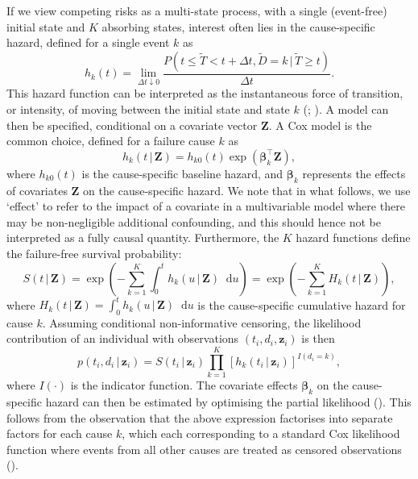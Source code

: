 \documentclass[
  letterpaper,
  paper=240mm:170mm,
  twoside=true,
  open=right,
  fontsize=10pt,
  pagesize=false,
  BCOR=15mm,
  DIV=14,
  headinclude=true,
  footinclude=false,
  headsepline=on]{scrbook}
\newcommand{\given}{\,|\,}
\newcommand\diff{\mathop{}\!\mathrm{d}}
\begin{document}
If we view competing risks as a multi-state process, with a single
(event-free) initial state and \(K\) absorbing states, interest often
lies in the cause-specific hazard, defined for a single event \(k\) as
\begin{equation*}
    h_k(t) = \lim_{\Delta t \downarrow 0} \frac{P(t \leq \tilde{T} < t + \Delta t, \tilde{D} = k \given \tilde{T} \geq t)}{\Delta t}.
\end{equation*} This hazard function can be interpreted as the
instantaneous force of transition, or intensity, of moving between the
initial state and state \(k\)
(;
). A model can then be specified, conditional on a covariate
vector \(\mathbf{Z}\). A Cox model is the common choice, defined for a
failure cause \(k\) as \begin{equation*}
    h_k(t \given \mathbf{Z}) = h_{k0}(t)\exp(\boldsymbol{\beta}_k^\top \mathbf{Z}),
\end{equation*} where \(h_{k0}(t)\) is the cause-specific baseline
hazard, and \(\boldsymbol{\beta}_k\) represents the effects of
covariates \(\mathbf{Z}\) on the cause-specific hazard. We note that in
what follows, we use `effect' to refer to the impact of a covariate in a
multivariable model where there may be non-negligible additional
confounding, and this should hence not be interpreted as a fully causal
quantity. Furthermore, the \(K\) hazard functions define the
failure-free survival probability: \begin{equation*}
    S(t \given \mathbf{Z}) = \exp \left( - \sum_{k = 1}^{K} \int_{0}^{t} h_k(u \given \mathbf{Z}) \diff u \right)
        = \exp \left( - \sum_{k = 1}^{K} H_k(t \given \mathbf{Z}) \right),
\end{equation*} where
\(H_k(t \given \mathbf{Z}) = \int_{0}^{t} h_k(u \given \mathbf{Z}) \diff u\)
is the cause-specific cumulative hazard for cause \(k\). Assuming
conditional non-informative censoring, the likelihood contribution of an
individual with observations \((t_i, d_i, \mathbf{z}_i)\) is then
\begin{equation}
    \label{eq:likelihood}
    p(t_i, d_i \given \mathbf{z}_i) = S(t_i \given \mathbf{z}_i) \prod_{k=1}^{K} \left[ h_k(t_i \given \mathbf{z}_i) \right]^{I(d_i=k)},
\end{equation} where \(I(\cdot)\) is the indicator function. The
covariate effects \(\boldsymbol{\beta}_k\) on the cause-specific hazard
can then be estimated by optimising the partial likelihood
(). This follows from
the observation that the above expression factorises into separate
factors for each cause \(k\), which each corresponding to a standard Cox
likelihood function where events from all other causes are treated as
censored observations
().
\end{document}
